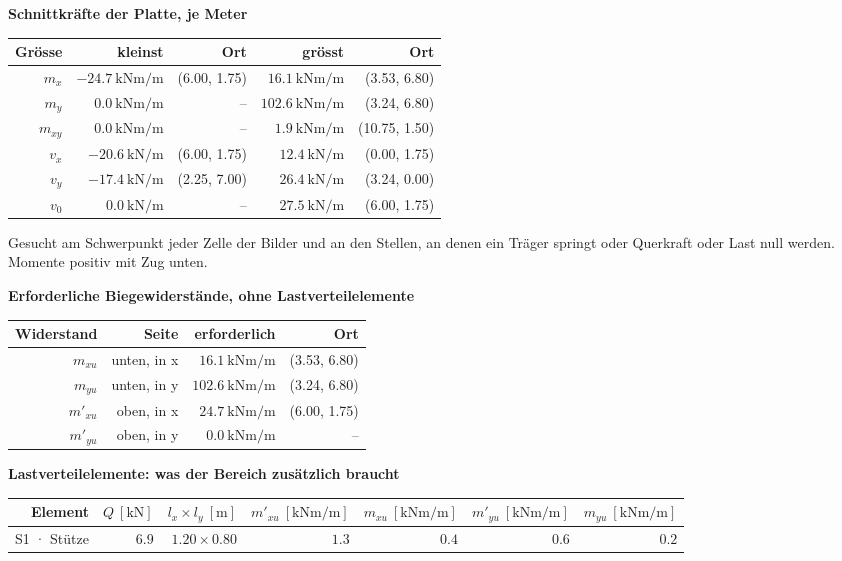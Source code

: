 \documentclass[11pt,a4paper]{article}
\begin{document}
\noindent\textbf{Schnittkräfte der Platte, je Meter}
\begin{longtable}{rrrrr}
\hline
Grösse & kleinst & Ort & grösst & Ort \\
\hline
\endhead
$m_x$ & $-24.7\ \mathrm{kNm/m}$ & (6.00, 1.75) & $16.1\ \mathrm{kNm/m}$ & (3.53, 6.80) \\
$m_y$ & $0.0\ \mathrm{kNm/m}$ & – & $102.6\ \mathrm{kNm/m}$ & (3.24, 6.80) \\
$m_{xy}$ & $0.0\ \mathrm{kNm/m}$ & – & $1.9\ \mathrm{kNm/m}$ & (10.75, 1.50) \\
$v_x$ & $-20.6\ \mathrm{kN/m}$ & (6.00, 1.75) & $12.4\ \mathrm{kN/m}$ & (0.00, 1.75) \\
$v_y$ & $-17.4\ \mathrm{kN/m}$ & (2.25, 7.00) & $26.4\ \mathrm{kN/m}$ & (3.24, 0.00) \\
$v_0$ & $0.0\ \mathrm{kN/m}$ & – & $27.5\ \mathrm{kN/m}$ & (6.00, 1.75) \\
\hline
\end{longtable}
Gesucht am Schwerpunkt jeder Zelle der Bilder und an den Stellen, an denen ein Träger springt oder Querkraft oder Last null werden. Momente positiv mit Zug unten.

\noindent\textbf{Erforderliche Biegewiderstände, ohne Lastverteilelemente}
\begin{longtable}{rrrr}
\hline
Widerstand & Seite & erforderlich & Ort \\
\hline
\endhead
$m_{xu}$ & unten, in x & $16.1\ \mathrm{kNm/m}$ & (3.53, 6.80) \\
$m_{yu}$ & unten, in y & $102.6\ \mathrm{kNm/m}$ & (3.24, 6.80) \\
$m'_{xu}$ & oben, in x & $24.7\ \mathrm{kNm/m}$ & (6.00, 1.75) \\
$m'_{yu}$ & oben, in y & $0.0\ \mathrm{kNm/m}$ & – \\
\hline
\end{longtable}
\noindent\textbf{Lastverteilelemente: was der Bereich zusätzlich braucht}
\begin{longtable}{rrrrrrr}
\hline
Element & $Q\ [\mathrm{kN}]$ & $l_x \times l_y\ [\mathrm{m}]$ & $m'_{xu}\ [\mathrm{kNm/m}]$ & $m_{xu}\ [\mathrm{kNm/m}]$ & $m'_{yu}\ [\mathrm{kNm/m}]$ & $m_{yu}\ [\mathrm{kNm/m}]$ \\
\hline
\endhead
S1 · Stütze & $6.9$ & $1.20 \times 0.80$ & $1.3$ & $0.4$ & $0.6$ & $0.2$ \\
\hline
\end{longtable}
\end{document}
